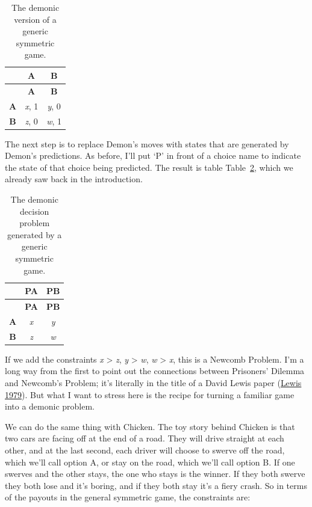 \documentclass[
  12pt,
  letterpaper,
  DIV=11,
  numbers=noendperiod]{scrreprt}
\begin{document}
\hypertarget{tbl-demon-sym-game}{}
\begin{longtable}[]{@{}ccc@{}}
\caption{\label{tbl-demon-sym-game}The demonic version of a generic
symmetric game.}\tabularnewline
\toprule\noalign{}
& \textbf{A} & \textbf{B} \\
\midrule\noalign{}
\endfirsthead
\toprule\noalign{}
& \textbf{A} & \textbf{B} \\
\midrule\noalign{}
\endhead
\bottomrule\noalign{}
\endlastfoot
\textbf{A} & \emph{x}, 1 & \emph{y}, 0 \\
\textbf{B} & \emph{z}, 0 & \emph{w}, 1 \\
\end{longtable}

The next step is to replace Demon's moves with states that are generated
by Demon's predictions. As before, I'll put `P' in front of a choice
name to indicate the state of that choice being predicted. The result is
table Table~\ref{tbl-gen-dem-problem}, which we already saw back in the
introduction.

\hypertarget{tbl-gen-dem-problem}{}
\begin{longtable}[]{@{}ccc@{}}
\caption{\label{tbl-gen-dem-problem}The demonic decision problem
generated by a generic symmetric game.}\tabularnewline
\toprule\noalign{}
& \textbf{PA} & \textbf{PB} \\
\midrule\noalign{}
\endfirsthead
\toprule\noalign{}
& \textbf{PA} & \textbf{PB} \\
\midrule\noalign{}
\endhead
\bottomrule\noalign{}
\endlastfoot
\textbf{A} & \emph{x} & \emph{y} \\
\textbf{B} & \emph{z} & \emph{w} \\
\end{longtable}

If we add the constraints \emph{x} \textgreater{} \emph{z}, \emph{y}
\textgreater{} \emph{w}, \emph{w} \textgreater{} \emph{x}, this is a
Newcomb Problem. I'm a long way from the first to point out the
connections between Prisoners' Dilemma and Newcomb's Problem; it's
literally in the title of a David Lewis paper
(\protect\hyperlink{ref-Lewis1979e}{Lewis 1979}). But what I want to
stress here is the recipe for turning a familiar game into a demonic
problem.

We can do the same thing with Chicken. The toy story behind Chicken is
that two cars are facing off at the end of a road. They will drive
straight at each other, and at the last second, each driver will choose
to swerve off the road, which we'll call option A, or stay on the road,
which we'll call option B. If one swerves and the other stays, the one
who stays is the winner. If they both swerve they both lose and it's
boring, and if they both stay it's a fiery crash. So in terms of the
payouts in the general symmetric game, the constraints are:
\end{document}
